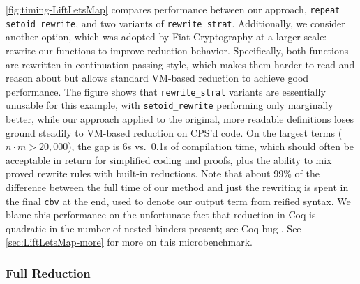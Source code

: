 \autoref{fig:timing-LiftLetsMap} compares performance between our approach, \texttt{repeat setoid\_rewrite}, and two variants of \texttt{rewrite\_strat}.
Additionally, we consider another option, which was adopted by Fiat Cryptography at a larger scale: rewrite our functions to improve reduction behavior.
Specifically, both functions are rewritten in continuation-passing style, which makes them harder to read and reason about but allows standard VM-based reduction to achieve good performance.
The figure shows that \texttt{rewrite\_strat} variants are essentially unusable for this example, with \texttt{setoid\_rewrite} performing only marginally better, while our approach applied to the original, more readable definitions loses ground steadily to VM-based reduction on CPS'd code.
On the largest terms ($n \cdot m > 20,000$), the gap is 6s vs.\ 0.1s of compilation time, which should often be acceptable in return for simplified coding and proofs, plus the ability to mix proved rewrite rules with built-in reductions.
Note that about 99\% of the difference between the full time of our method and just the rewriting is spent in the final \texttt{cbv} at the end, used to denote our output term from reified syntax.
We blame this performance on the unfortunate fact that reduction in Coq is quadratic in the number of nested binders present; see Coq bug .
See \autoref{sec:LiftLetsMap-more} for more on this microbenchmark.

\subsubsection{Full Reduction} \label{sec:micro:Eratosthenes}

